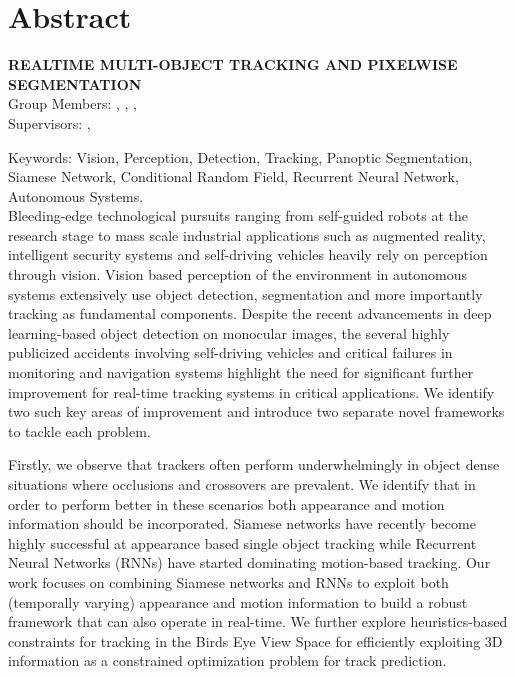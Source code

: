 \chapter*{Abstract}

\begin{center}
	\vspace{5mm}
	\MakeUppercase{\textbf{Realtime Multi-Object Tracking and Pixelwise Segmentation}}\\
	\vspace{5mm}
	Group Members: \memberA, \memberB, \memberC, \memberD \\
	\vspace{5mm}
	Supervisors: \supervisorA, \supervisorB \\
	\vspace{5mm}
\end{center}

\noindent Keywords: Vision, Perception, Detection, Tracking, Panoptic Segmentation, Siamese Network, Conditional Random Field, Recurrent Neural Network, Autonomous Systems. \\

Bleeding-edge technological pursuits ranging from self-guided robots at the research stage to mass scale industrial applications such as augmented reality, intelligent security systems and self-driving vehicles heavily rely on perception through vision. Vision based perception of the environment in autonomous systems extensively use object detection, segmentation and more importantly tracking as fundamental components. Despite the recent advancements in deep learning-based object detection on monocular images, the several highly publicized accidents involving self-driving vehicles and critical failures in monitoring and navigation systems highlight the need for significant further improvement for real-time tracking systems in critical applications. We identify two such key areas of improvement and introduce two separate novel frameworks to tackle each problem. 

Firstly, we observe that trackers often perform underwhelmingly in object dense situations where occlusions and crossovers are prevalent. We identify that in order to perform better in these scenarios both appearance and motion information should be incorporated. Siamese networks have recently become highly successful at appearance based single object tracking while Recurrent Neural Networks (RNNs) have started dominating motion-based tracking. Our work focuses on combining Siamese networks and RNNs to exploit both (temporally varying) appearance and motion information to build a robust framework that can also operate in real-time. We further explore heuristics-based constraints for tracking in the Birds Eye View Space for efficiently exploiting 3D information as a constrained optimization problem for track prediction. 

